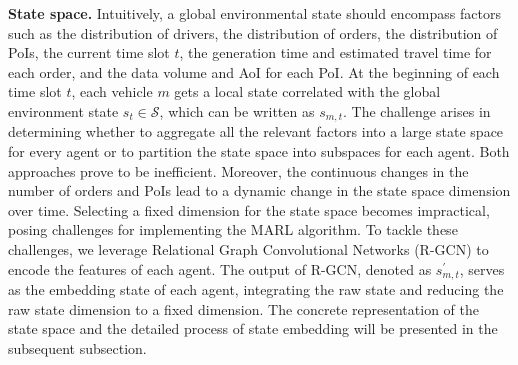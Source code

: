 \noindent\textbf{State space.} Intuitively, a global environmental state should encompass factors such as the distribution of drivers, the distribution of orders, the distribution of PoIs, the current time slot $t$, the generation time and estimated travel time for each order, and the data volume and AoI for each PoI. At the beginning of each time slot $t$, each vehicle $m$ gets a local state correlated with the global environment state $s_t \in \mathcal{S}$, which can be written as ${s_{m,t}}$. The challenge arises in determining whether to aggregate all the relevant factors into a large state space for every agent or to partition the state space into subspaces for each agent. Both approaches prove to be inefficient. Moreover, the continuous changes in the number of orders and PoIs lead to a dynamic change in the state space dimension over time. Selecting a fixed dimension for the state space becomes impractical, posing challenges for implementing the MARL algorithm. To tackle these challenges, we leverage Relational Graph Convolutional Networks (R-GCN) \cite{R-GCN} to encode the features of each agent. The output of R-GCN, denoted as $s^{\prime}_{m,t}$, serves as the embedding state of each agent, integrating the raw state and reducing the raw state dimension to a fixed dimension. The concrete representation of the state space and the detailed process of state embedding will be presented in the subsequent subsection.




